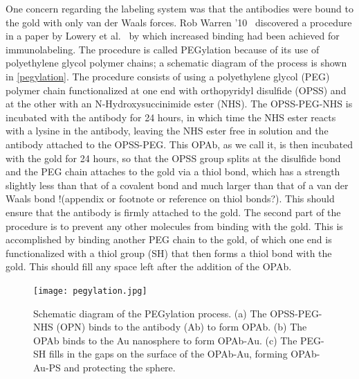 One concern regarding the labeling system was that the antibodies were bound to the gold with only van der Waals forces. Rob Warren '10~\citep{warren} discovered a procedure in a paper by Lowery et al.~\citep{westpegylation} by which increased binding had been achieved for immunolabeling. The procedure is called PEGylation because of its use of polyethylene glycol polymer chains; a schematic diagram of the process is shown in \autoref{pegylation}. The procedure consists of using a polyethylene glycol (PEG) polymer chain functionalized at one end with orthopyridyl disulfide (OPSS) and at the other with an N-Hydroxysuccinimide ester (NHS). The OPSS-PEG-NHS is incubated with the antibody for 24 hours, in which time the NHS ester reacts with a lysine in the antibody, leaving the NHS ester free in solution and the antibody attached to the OPSS-PEG. This OPAb, as we call it, is then incubated with the gold for 24 hours, so that the OPSS group splits at the disulfide bond and the PEG chain attaches to the gold via a thiol bond, which has a strength slightly less than that of a covalent bond and much larger than that of a van der Waals bond !(appendix or footnote or reference on thiol bonds?). This should ensure that the antibody is firmly attached to the gold. The second part of the procedure is to prevent any other molecules from binding with the gold. This is accomplished by binding another PEG chain to the gold, of which one end is functionalized with a thiol group (SH) that then forms a thiol bond with the gold. This should fill any space left after the addition of the OPAb. 

\begin{figure}[htbp]
\centering
\texttt{[image: pegylation.jpg]}
\caption{Schematic diagram of the PEGylation process. (a) The OPSS-PEG-NHS (OPN) binds to the antibody (Ab) to form OPAb. (b) The OPAb binds to the Au nanosphere to form OPAb-Au. (c) The PEG-SH fills in the gaps on the surface of the OPAb-Au, forming OPAb-Au-PS and protecting the sphere.}
\label{pegylation}
\end{figure}



